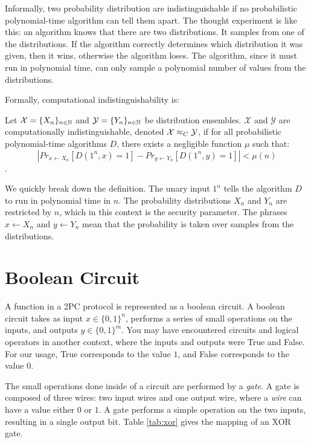 Informally, two probability distribution are indistinguishable if no probabilistic polynomial-time algorithm can tell them apart.
The thought experiment is like this: an algorithm knows that there are two distributions.
It samples from one of the distributions.
If the algorithm correctly determines which distribution it was given, then it wins, otherwise the algorithm loses.
The algorithm, since it must run in polynomial time, can only sample a polynomial number of values from the distributions.

Formally, computational indistinguishability is:

\begin{definition}
\label{defn:computational-indistinguishability}
Let $\mathcal{X} = \{X_n\}_{n \in \mathbb{N}}$ and $\mathcal{Y} = \{Y_n\}_{n \in \mathbb{N}}$ be distribution ensembles.
$\mathcal{X}$ and $\mathcal{Y}$ are computationally indistinguishable, denoted $\mathcal{X} \approx_C \mathcal{Y}$, if for all probabilistic polynomial-time algorithms $D$, there exists a negligible function $\mu$ such that:
\begin{equation}
    |Pr_{x \gets X_n} [D(1^n, x) = 1] - Pr_{y \gets Y_n} [D(1^n, y) = 1]| < \mu(n)
\end{equation}
\cite{katzlindelltextbook}.
\end{definition}

We quickly break down the definition.
The unary input $1^n$ tells the algorithm $D$ to run in polynomial time in $n$.
The probability distributions $X_n$ and $Y_n$ are restricted by $n$, which in this context is the security parameter.
The phrases $x \gets X_n$ and $y \gets Y_n$ mean that the probability is taken over samples from the distributions.

\section{Boolean Circuit} 
A function in a 2PC protocol is represented as a boolean circuit.
A boolean circuit takes as input $x \in \{0,1\}^n$, performs a series of small operations on the inputs, and outputs $y \in \{0,1\}^m$.  
You may have encountered circuits and logical operators in another context, where the inputs and outputs were True and False.
For our usage, True corresponds to the value $1$, and False corresponds to the value $0$. 

The small operations done inside of a circuit are performed by a \emph{gate}.
A gate is composed of three wires: two input wires and one output wire, where a \emph{wire} can have a value either $0$ or $1$.
A gate performs a simple operation on the two inputs, resulting in a single output bit.
Table \ref{tab:xor} gives the mapping of an XOR gate.

